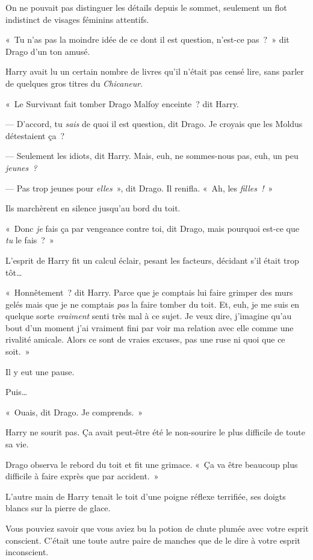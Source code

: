 \later

On ne pouvait pas distinguer les détails depuis le sommet, seulement un flot indistinct de visages féminins attentifs.

«~Tu n'as pas la moindre idée de ce dont il est question, n'est-ce pas~?~» dit Drago d'un ton amusé.

Harry avait lu un certain nombre de livres qu'il n'était pas censé lire, sans parler de quelques gros titres du \emph{Chicaneur}.

«~Le Survivant fait tomber Drago Malfoy enceinte~? dit Harry.

--- D'accord, tu \emph{sais} de quoi il est question, dit Drago. Je croyais que les Moldus détestaient ça~?

--- Seulement les idiots, dit Harry. Mais, euh, ne sommes-nous pas, euh, un peu \emph{jeunes~?}

--- Pas trop jeunes pour \emph{elles}~», dit Drago. Il renifla. «~Ah, les \emph{filles~!}~»

Ils marchèrent en silence jusqu'au bord du toit.

«~Donc \emph{je} fais ça par vengeance contre toi, dit Drago, mais pourquoi est-ce que \emph{tu} le fais~?~»

L'esprit de Harry fit un calcul éclair, pesant les facteurs, décidant s'il était trop tôt…

«~Honnêtement~? dit Harry. Parce que je comptais lui faire grimper des murs gelés mais que je ne comptais \emph{pas} la faire tomber du toit. Et, euh, je me suis en quelque sorte \emph{vraiment} senti très mal à ce sujet. Je veux dire, j'imagine qu'au bout d'un moment j'ai vraiment fini par voir ma relation avec elle comme une rivalité amicale. Alors ce sont de vraies excuses, pas une ruse ni quoi que ce soit.~»

Il y eut une pause.

Puis…

«~Ouais, dit Drago. Je comprends.~»

Harry ne sourit pas. Ça avait peut-être été le non-sourire le plus difficile de toute sa vie.

Drago observa le rebord du toit et fit une grimace. «~Ça va être beaucoup plus difficile à faire exprès que par accident.~»

\later

L'autre main de Harry tenait le toit d'une poigne réflexe terrifiée, ses doigts blancs sur la pierre de glace.

Vous pouviez savoir que vous aviez bu la potion de chute plumée avec votre esprit conscient. C'était une toute autre paire de manches que de le dire à votre esprit inconscient.

